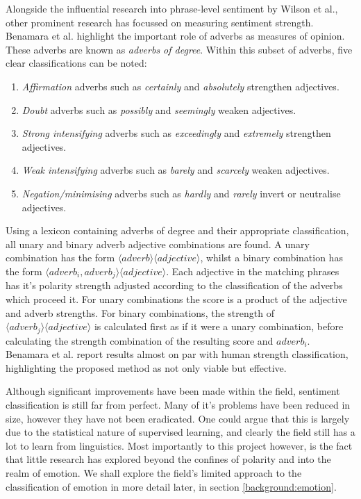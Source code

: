 Alongside the influential research into phrase-level sentiment by Wilson et al., other prominent research has focussed on measuring sentiment strength. Benamara et al. \cite{Benamara:2007wz} highlight the important role of adverbs as measures of opinion. These adverbs are known as \emph{adverbs of degree}. Within this subset of adverbs, five clear classifications can be noted:

\begin{enumerate}
	\item \emph{Affirmation} adverbs such as \emph{certainly} and \emph{absolutely} strengthen adjectives.
	\item \emph{Doubt} adverbs such as \emph{possibly} and \emph{seemingly} weaken adjectives.
	\item \emph{Strong intensifying} adverbs such as \emph{exceedingly} and \emph{extremely} strengthen adjectives.
	\item \emph{Weak intensifying} adverbs such as \emph{barely} and \emph{scarcely} weaken adjectives.
	\item \emph{Negation/minimising} adverbs such as \emph{hardly} and \emph{rarely} invert or neutralise adjectives.
\end{enumerate}

Using a lexicon containing adverbs of degree and their appropriate classification, all unary and binary adverb adjective combinations are found. A unary combination has the form $\langle adverb \rangle\langle adjective \rangle$, whilst a binary combination has the form $\langle adverb_i, adverb_j \rangle\langle adjective \rangle$. Each adjective in the matching phrases has it's polarity strength adjusted according to the classification of the adverbs which proceed it. For unary combinations the score is a product of the adjective and adverb strengths. For binary combinations, the strength of $\langle adverb_j \rangle\langle adjective \rangle$ is calculated first as if it were a unary combination, before calculating the strength combination of the resulting score and $adverb_i$. Benamara et al. report results almost on par with human strength classification, highlighting the proposed method as not only viable but effective.

Although significant improvements have been made within the field, sentiment classification is still far from perfect. Many of it's problems have been reduced in size, however they have not been eradicated. One could argue that this is largely due to the statistical nature of supervised learning, and clearly the field still has a lot to learn from linguistics. Most importantly to this project however, is the fact that little research has explored beyond the confines of polarity and into the realm of emotion. We shall explore the field's limited approach to the classification of emotion in more detail later, in section \ref{background:emotion}.

